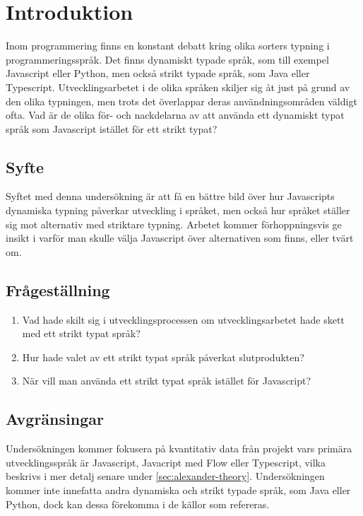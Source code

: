 \section{Introduktion}
\label{sec:alexander-introduction}
Inom programmering finns en konstant debatt kring olika sorters typning i programmeringsspråk. Det finns dynamiskt typade språk, som till exempel Javascript eller Python, men också strikt typade språk, som Java eller Typescript. Utvecklingsarbetet i de olika språken skiljer sig åt just på grund av den olika typningen, men trots det överlappar deras användningsområden väldigt ofta. Vad är de olika för- och nackdelarna av att använda ett dynamiskt typat språk som Javascript istället för ett strikt typat?

\subsection{Syfte}
\label{subsec:motivation}

Syftet med denna undersökning är att få en bättre bild över hur Javascripts dynamiska typning påverkar utveckling i språket, men också hur språket ställer sig mot alternativ med striktare typning. Arbetet kommer förhoppningsvis ge insikt i varför man skulle välja Javascript över alternativen som finns, eller tvärt om.

\subsection{Frågeställning}
\label{subsec:research-questions}

\begin{enumerate}
\item\label{alexander-fs:1} Vad hade skilt sig i utvecklingsprocessen om utvecklingsarbetet hade skett med ett strikt typat språk?

\item\label{alexander-fs:2} Hur hade valet av ett strikt typat språk påverkat slutprodukten?

\item\label{alexander-fs:3} När vill man använda ett strikt typat språk istället för Javascript?

\end{enumerate}


\subsection{Avgränsingar}
\label{subsec:delimitations}

Undersökningen kommer fokusera på kvantitativ data från projekt vars primära utvecklingsspråk är Javascript, Javacript med Flow eller Typescript, vilka beskrivs i mer detalj senare under \ref{sec:alexander-theory}. Undersökningen kommer inte innefatta andra dynamiska och strikt typade språk, som Java eller Python, dock kan dessa förekomma i de källor som refereras.




